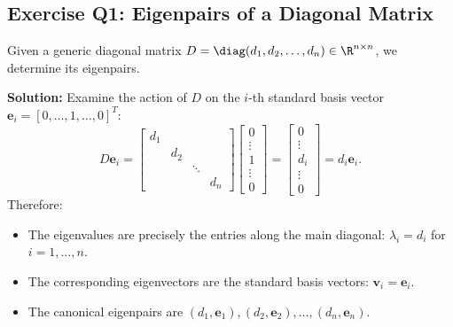 \subsection{Exercise Q1: Eigenpairs of a Diagonal Matrix}

\begin{example}
\label{ex:q1-diagonal-matrix}
Given a generic diagonal matrix $D = \diag(d_1, d_2, \dots, d_n) \in \R^{n \times n}$, we determine its eigenpairs.

\noindent\textbf{Solution:}
Examine the action of $D$ on the $i$-th standard basis vector $\mathbf{e}_i = [0, \dots, 1, \dots, 0]^T$:
\begin{equation}
    D \mathbf{e}_i = \begin{bmatrix} d_1 & & & \\ & d_2 & & \\ & & \ddots & \\ & & & d_n \end{bmatrix} \begin{bmatrix} 0 \\ \vdots \\ 1 \\ \vdots \\ 0 \end{bmatrix} = \begin{bmatrix} 0 \\ \vdots \\ d_i \\ \vdots \\ 0 \end{bmatrix} = d_i \mathbf{e}_i.
\end{equation}
Therefore:
\begin{itemize}
    \item The eigenvalues are precisely the entries along the main diagonal: $\lambda_i = d_i$ for $i = 1, \dots, n$.
    \item The corresponding eigenvectors are the standard basis vectors: $\mathbf{v}_i = \mathbf{e}_i$.
    \item The canonical eigenpairs are $(d_1, \mathbf{e}_1), (d_2, \mathbf{e}_2), \dots, (d_n, \mathbf{e}_n)$.
\end{itemize}
\end{example}

